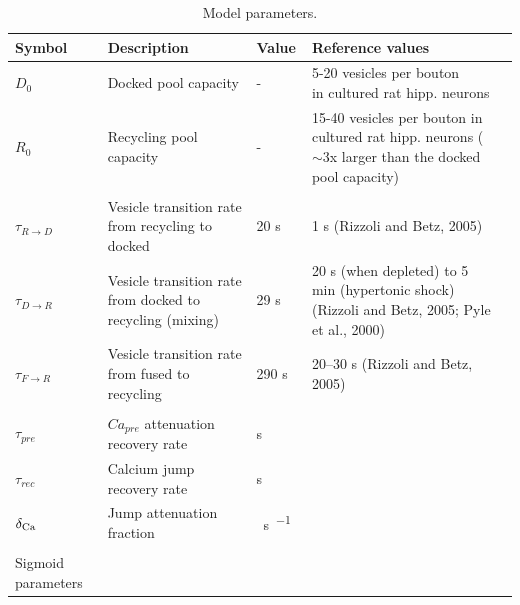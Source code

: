 \documentclass[fleqn,10pt]{wlscirep}
\begin{document}
\begin{table}[!ht]
	\centering
	\caption{Model parameters.}
	\label{tab:model_params}
	\begin{tabular}{@{}lllll@{}}
		\toprule
		{\bf Symbol} & {\bf Description}                     & {\bf Value}     & {\bf Reference values}      \\
		\midrule

		$D_0$          & Docked pool capacity                                  & - & \makecell[l]{5-20 vesicles per bouton \\in cultured rat hipp. neurons \cite{rizzoliSynapticVesiclePools2005,schikorskiMorphologicalCorrelatesFunctionally2001}} \\
		$R_0$          & Recycling pool capacity                                  & -  & \makecell[l]{15-40 vesicles per bouton in cultured rat hipp.\\ neurons   ($\sim$3x larger than the docked pool capacity)} \cite{rizzoliSynapticVesiclePools2005,schikorskiMorphologicalCorrelatesFunctionally2001}	\\

		\\
		$\tau_{R\rightarrow D}$          & Vesicle transition rate from  recycling to docked                                 & 20 \unit{\second} & 1 s (Rizzoli and Betz, 2005)\\ 
		$\tau_{D\rightarrow R}$          & Vesicle transition rate from docked to recycling (mixing)                                 & 29 \unit{\second} & 20 s (when depleted) to 5 min (hypertonic shock)
		(Rizzoli and Betz, 2005; Pyle et al., 2000) \\
		$\tau_{F\rightarrow R}$          & Vesicle transition rate from fused to recycling                                  & 290 \unit{\second}  & 20–30 s (Rizzoli and Betz, 2005) \\
		\\
		$\tau_{pre}$ &  $Ca_{pre}$ attenuation recovery rate & \unit{\second} \\
		$\tau_{rec}$ & Calcium jump recovery rate & \unit{\second} \\
		$\delta_{\rm Ca}$ & Jump attenuation fraction  & \unit{\per \second \per \milli \Molar} \\
		\\
		Sigmoid parameters\\
		\bottomrule
	\end{tabular}
\end{table}
\end{document}

